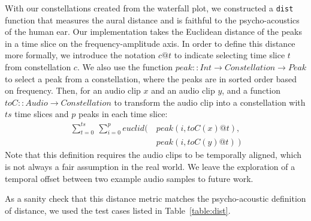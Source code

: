 With our constellations created from the waterfall plot, we constructed a \texttt{dist} function that measures the aural distance and is faithful to the psycho-acoustics of the human ear.
Our implementation takes the Euclidean distance of the peaks in a time slice on the frequency-amplitude axis.
In order to define this distance more formally, we introduce the notation $c@t$ to indicate selecting time slice $t$ from constellation $c$.
We also use the function $peak:: Int \to Constellation \to Peak$ to select a peak from a constellation, where the peaks are in sorted order based on frequency.
Then, for an audio clip $x$ and an audio clip $y$, and a function $toC :: Audio \to Constellation$ to transform the audio clip into a constellation with $ts$ time slices and $p$ peaks in each time slice:
%
\begin{align*}
\sum_{t=0}^{ts}\ \sum_{i=0}^{p} euclid\Big(\ &peak(i,toC(x)@t), \\ &peak(i,toC(y)@t)\ \Big)
\end{align*}
%
Note that this definition requires the audio clips to be temporally aligned, which is not always a fair assumption in the real world. We leave the exploration of a temporal offset between two example audio samples to future work.

As a sanity check that this distance metric matches the psycho-acoustic definition of distance, we used the test cases listed in Table~\ref{table:dist}.

